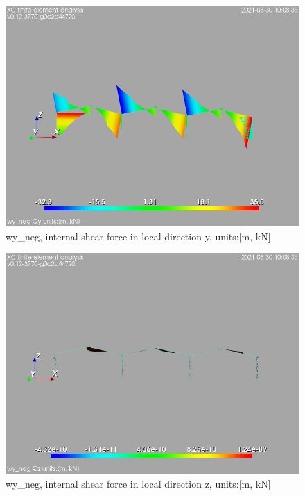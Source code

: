 \begin{figure}
\begin{center}
\includegraphics[width=\linewidth]{calc_results/sole_zeinali/text/graphics/resSimplLC/wy_negallMemberSetQy}
\caption{wy_neg, internal shear force in local direction y, units:[m, kN]}
\end{center}
\end{figure}
\begin{figure}
\begin{center}
\includegraphics[width=\linewidth]{calc_results/sole_zeinali/text/graphics/resSimplLC/wy_negallMemberSetQz}
\caption{wy_neg, internal shear force in local direction z, units:[m, kN]}
\end{center}
\end{figure}
